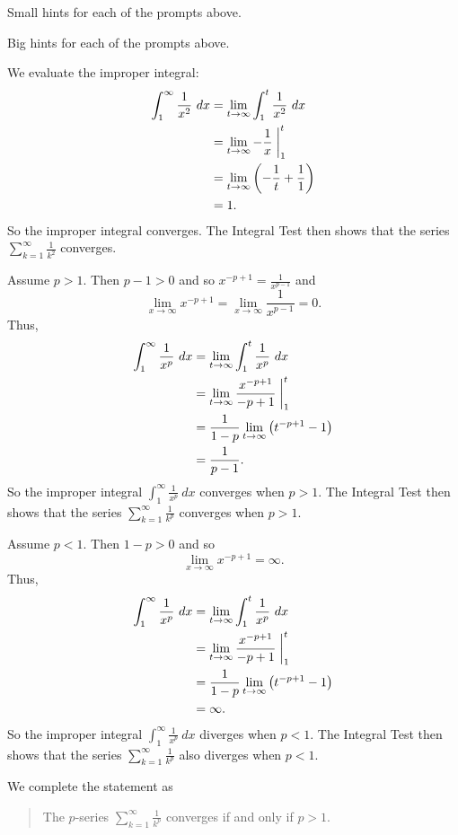 \begin{smallhint}
\ba
	\item Small hints for each of the prompts above.
\ea
\end{smallhint}
\begin{bighint}
\ba
	\item Big hints for each of the prompts above.
\ea
\end{bighint}
\begin{activitySolution}
\ba
	\item We evaluate the improper integral:
\begin{align*}
\int_{1}^{\infty} \frac{1}{x^2} \ dx &= \lim_{t \to \infty} \int_{1}^{t} \frac{1}{x^2} \ dx \\
    &= \lim_{t \to \infty} -\frac{1}{x} \biggm|_{1}^{t} \\
    &= \lim_{t \to \infty} \left(-\frac{1}{t} + \frac{1}{1} \right) \\
    &= 1.
\end{align*}
So the improper integral converges. The Integral Test then shows that the series $ \sum_{k=1}^{\infty} \frac{1}{k^2}$ converges.
    \item Assume $p > 1$. Then $p-1 > 0$ and so $x^{-p+1} = \frac{1}{x^{p-1}}$ and
\[ \lim_{x \to \infty} x^{-p+1} = \lim_{x \to \infty} \frac{1}{x^{p-1}} = 0.\]
Thus,
\begin{align*}
\int_{1}^{\infty} \frac{1}{x^p} \ dx &= \lim_{t \to \infty} \int_{1}^{t} \frac{1}{x^p} \ dx \\
    &= \lim_{t \to \infty} \frac{x^{-p+1}}{-p+1} \biggm|_{1}^{t} \\
    &= \frac{1}{1-p} \lim_{t \to \infty} \left(t^{-p+1} -  1 \right) \\
    &= \frac{1}{p-1}.
\end{align*}
So the improper integral $ \int_1^{\infty} \frac{1}{x^p} \ dx$ converges when $p > 1$. The Integral Test then shows that the series $ \sum_{k=1}^{\infty} \frac{1}{k^p}$ converges when $p > 1$.
    \item Assume $p < 1$. Then $1-p > 0$ and so
\[ \lim_{x \to \infty} x^{-p+1} = \infty.\]
Thus,
\begin{align*}
\int_{1}^{\infty} \frac{1}{x^p} \ dx &= \lim_{t \to \infty} \int_{1}^{t} \frac{1}{x^p} \ dx \\
    &= \lim_{t \to \infty} \frac{x^{-p+1}}{-p+1} \biggm|_{1}^{t} \\
    &= \frac{1}{1-p} \lim_{t \to \infty} \left(t^{-p+1} -  1 \right) \\
    &= \infty.
\end{align*}
So the improper integral $ \int_1^{\infty} \frac{1}{x^p} \ dx$ diverges when $p < 1$. The Integral Test then shows that the series $ \sum_{k=1}^{\infty} \frac{1}{k^p}$ also diverges when $p < 1$.
    \item We complete the statement as
\begin{quote}
The $p$-series $ \sum_{k=1}^{\infty} \frac{1}{k^p}$ converges if and only if $p > 1$.
\end{quote}
\ea
\end{activitySolution}
\aftera 